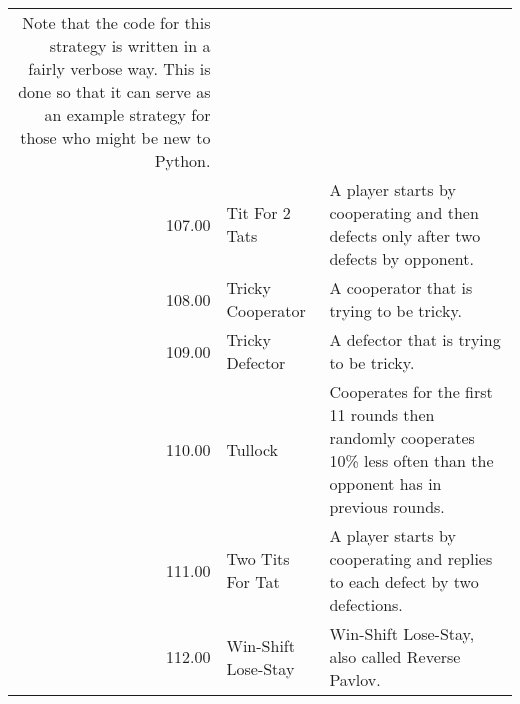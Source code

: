 \begin{table}[!hbtp]
\begin{adjustbox}{width=2\textwidth, angle=90}
\begin{tabular}{rll}
	Note that the code for this strategy is written in a fairly verbose
	way. This is done so that it can serve as an example strategy for
	those who might be new to Python.                                                                                                                                                                                                                                                                                                                                                                                                                                                                                                                                                                                                                                                                                                                                             \\
	107.00 & Tit For 2 Tats              & A player starts by cooperating and then defects only after two defects by opponent.                                               \\
	108.00 & Tricky Cooperator           & A cooperator that is trying to be tricky.                                                                                         \\
	109.00 & Tricky Defector             & A defector that is trying to be tricky.                                                                                           \\
	110.00 & Tullock                     & Cooperates for the first 11 rounds then randomly cooperates 10\% less often
	than the opponent has in previous rounds.                                                                                                                                                                                                                                                                                                                                                                                                                                                                                                                                                                                                                                                                                                                                                                                                                                                                                                 \\
	111.00 & Two Tits For Tat            & A player starts by cooperating and replies to each defect by two defections.                                                      \\
	112.00 & Win-Shift Lose-Stay         & Win-Shift Lose-Stay, also called Reverse Pavlov.


\end{tabular}
\end{adjustbox}
\end{table}
